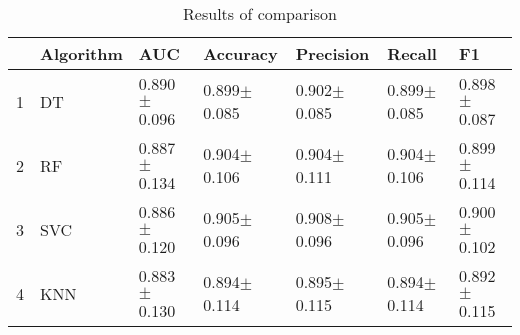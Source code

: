 \begin{table}
\footnotesize
\caption{Results of comparison}
\label{tab:comparison}
\begin{tabular}{lllllll}
\hline
 & Algorithm & AUC & Accuracy & Precision & Recall & F1 \\
\hline
1 & DT & 0.890$\pm$0.096 & 0.899$\pm$0.085 & 0.902$\pm$0.085 & 0.899$\pm$0.085 & 0.898$\pm$0.087 \\
2 & RF & 0.887$\pm$0.134 & 0.904$\pm$0.106 & 0.904$\pm$0.111 & 0.904$\pm$0.106 & 0.899$\pm$0.114 \\
3 & SVC & 0.886$\pm$0.120 & 0.905$\pm$0.096 & 0.908$\pm$0.096 & 0.905$\pm$0.096 & 0.900$\pm$0.102 \\
4 & KNN & 0.883$\pm$0.130 & 0.894$\pm$0.114 & 0.895$\pm$0.115 & 0.894$\pm$0.114 & 0.892$\pm$0.115 \\
\hline
\end{tabular}
\end{table}
